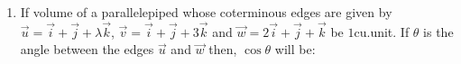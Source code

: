 \documentclass[journal,12pt,onecolumn]{IEEEtran}
\theoremstyle{remark}
\begin{document}
\begin{enumerate}
\hfill{}
\begin{enumerate}
\end{enumerate}

\item If volume of a parallelepiped whose coterminous edges are given by\newline
$\vec{u} = \vec{i}+\vec{j}+\lambda\vec{k}$,\newline
$\vec{v} = \vec{i}+\vec{j}+3\vec{k}$ and\newline
$\vec{w} = 2\vec{i}+\vec{j}+\vec{k}$\newline
be $1$cu.unit. If $\theta$ is the angle between the edges $\vec{u}$ and $\vec{w}$ then, $\cos\theta$ will be:

\hfill{}
\begin{enumerate}
\end{enumerate}

\end{enumerate}
\end{document}
